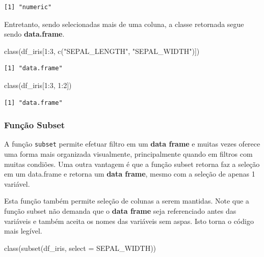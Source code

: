 \documentclass[
  letterpaper,
  DIV=11,
  numbers=noendperiod]{scrreprt}
\newenvironment{Shaded}{\begin{snugshade}}{\end{snugshade}}
\newcommand{\AttributeTok}[1]{\textcolor[rgb]{0.40,0.45,0.13}{#1}}
\newcommand{\DecValTok}[1]{\textcolor[rgb]{0.68,0.00,0.00}{#1}}
\newcommand{\FunctionTok}[1]{\textcolor[rgb]{0.28,0.35,0.67}{#1}}
\newcommand{\NormalTok}[1]{\textcolor[rgb]{0.00,0.23,0.31}{#1}}
\newcommand{\SpecialCharTok}[1]{\textcolor[rgb]{0.37,0.37,0.37}{#1}}
\newcommand{\StringTok}[1]{\textcolor[rgb]{0.13,0.47,0.30}{#1}}
\begin{document}
\begin{verbatim}
[1] "numeric"
\end{verbatim}

Entretanto, sendo selecionadas mais de uma coluna, a classe retornada
segue sendo \textbf{data.frame}.

\begin{Shaded}
\begin{Highlighting}[]
\FunctionTok{class}\NormalTok{(df\_iris[}\DecValTok{1}\SpecialCharTok{:}\DecValTok{3}\NormalTok{, }\FunctionTok{c}\NormalTok{(}\StringTok{"SEPAL\_LENGTH"}\NormalTok{, }\StringTok{"SEPAL\_WIDTH"}\NormalTok{)])}
\end{Highlighting}
\end{Shaded}

\begin{verbatim}
[1] "data.frame"
\end{verbatim}

\begin{Shaded}
\begin{Highlighting}[]
\FunctionTok{class}\NormalTok{(df\_iris[}\DecValTok{1}\SpecialCharTok{:}\DecValTok{3}\NormalTok{, }\DecValTok{1}\SpecialCharTok{:}\DecValTok{2}\NormalTok{])}
\end{Highlighting}
\end{Shaded}

\begin{verbatim}
[1] "data.frame"
\end{verbatim}

\hypertarget{funuxe7uxe3o-subset}{%
\subsubsection{Função Subset}\label{funuxe7uxe3o-subset}}

A função \texttt{subset} permite efetuar filtro em um \textbf{data
frame} e muitas vezes oferece uma forma mais organizada visualmente,
principalmente quando em filtros com muitas condiões. Uma outra vantagem
é que a função subset retorna faz a seleção em um data.frame e retorna
um \textbf{data frame}, mesmo com a seleção de apenas 1 variável.

Esta função também permite seleção de colunas a serem mantidas. Note que
a função subset não demanda que o \textbf{data frame} seja referenciado
antes das variáveis e também aceita os nomes das variáveis sem aspas.
Isto torna o código mais legível.

\begin{Shaded}
\begin{Highlighting}[]
\FunctionTok{class}\NormalTok{(}\FunctionTok{subset}\NormalTok{(df\_iris, }\AttributeTok{select =}\NormalTok{ SEPAL\_WIDTH))}
\end{Highlighting}
\end{Shaded}
\end{document}
